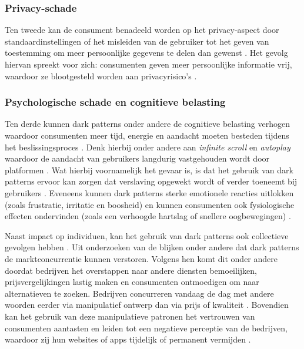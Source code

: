 \vspace{1em}

\subsubsection{Privacy-schade} 
Ten tweede kan de consument benadeeld worden op het privacy-aspect door standaardinstellingen of het misleiden van de gebruiker tot het geven van toestemming om meer persoonlijke gegevens te delen dan gewenst \autocite{OECD2022, Commissie2022}. Het gevolg hiervan spreekt voor zich: consumenten geven meer persoonlijke informatie vrij, waardoor ze blootgesteld worden aan privacyrisico’s \autocite{OECD2022}.

\vspace{1em}

\subsubsection{Psychologische schade en cognitieve belasting} 
Ten derde kunnen dark patterns onder andere de cognitieve belasting verhogen waardoor consumenten meer tijd, energie en aandacht moeten besteden tijdens het beslissingsproces \autocite{OECD2022, Commissie2022}. Denk hierbij onder andere aan \textit{infinite scroll} en \textit{autoplay} waardoor de aandacht van gebruikers langdurig vastgehouden wordt door platformen \autocite{OECD2022}. Wat hierbij voornamelijk het gevaar is, is dat het gebruik van dark patterns ervoor kan zorgen dat verslaving opgewekt wordt of verder toeneemt bij gebruikers \autocite{OECD2022}. Eveneens kunnen dark patterns sterke emotionele reacties uitlokken (zoals frustratie, irritatie en boosheid) en kunnen consumenten ook fysiologische effecten ondervinden (zoals een verhoogde hartslag of snellere oogbewegingen) \autocite{OECD2022}.

\vspace{2em}

Naast impact op individuen, kan het gebruik van dark patterns ook collectieve gevolgen hebben \autocite{OECD2022}.  Uit onderzoeken van de \textcite{OECD2022, Commissie2022} blijken onder andere dat dark patterns de marktconcurrentie kunnen verstoren. Volgens hen komt dit onder andere doordat bedrijven het overstappen naar andere diensten bemoeilijken, prijsvergelijkingen lastig maken en consumenten ontmoedigen om naar alternatieven te zoeken. Bedrijven concurreren vandaag de dag met andere woorden eerder via manipulatief ontwerp dan via prijs of kwaliteit \autocite{OECD2022}. Bovendien kan het gebruik van deze manipulatieve patronen het vertrouwen van consumenten aantasten en leiden tot een negatieve perceptie van de bedrijven, waardoor zij hun websites of apps tijdelijk of permanent vermijden \autocite{OECD2022}.

